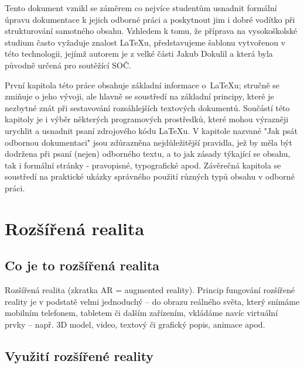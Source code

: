 \documentclass[12pt, a4paper,
twoside,        %
openright
]{report}
\begin{document}
Tento dokument vznikl se záměrem co nejvíce studentům usnadnit formální úpravu dokumentace k jejich odborné práci a poskytnout jim i dobré vodítko při strukturování samotného obsahu. Vzhledem k tomu, že příprava na vysokoškolské studium často vyžaduje znalost {\LaTeX}u, představujeme šablonu vytvořenou v této technologii, jejímž autorem je z velké části Jakub Dokulil a která byla původně určená pro soutěžící SOČ.  

První kapitola této práce obsahuje základní informace o~{\LaTeX}u; stručně se zmiňuje o jeho vývoji, ale hlavně se soustředí na základní principy, které je nezbytné znát při sestavování rozsáhlejších  textových dokumentů. Součástí této kapitoly je i výběr některých programových prostředků, které mohou výrazněji urychlit a usnadnit psaní zdrojového kódu {\LaTeX}u. V kapitole nazvané "Jak psát odbornou dokumentaci" jsou zdůrazněna nejdůležitější pravidla, jež by měla být dodržena při psaní (nejen) odborného textu, a to jak zásady týkající se obsahu, tak i formální stránky - pravopisné, typografické apod. Závěrečná kapitola se soustředí na praktické ukázky správného použití různých typů obsahu v odborné práci. 



\chapter{Rozšířená realita}

\section{Co je to rozšířená realita}
\label{sec:co_je_to_AR}
Rozšířená realita (zkratka AR = augmented reality). Princip fungování rozšířené reality je v podstatě velmi jednoduchý – do obrazu reálného světa, který snímáme mobilním telefonem, tabletem či dalším zařízením, vkládáme navíc virtuální prvky – např. 3D model, video, textový či grafický popis, animace apod.




\section{Využití rozšířené reality}
\label{sec:vyuziti_AR}
\end{document}
